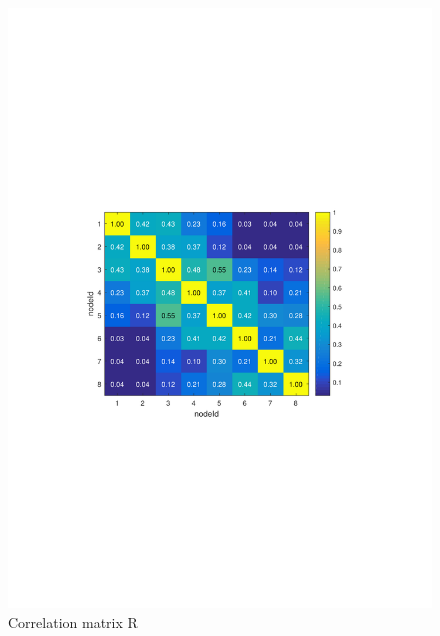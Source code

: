 \begin{figure}
\includegraphics[scale=0.75]{./pics/correlation.pdf}
\caption{Correlation matrix R}
\centering
\label{fig:corrMatrix}

\end{figure}

